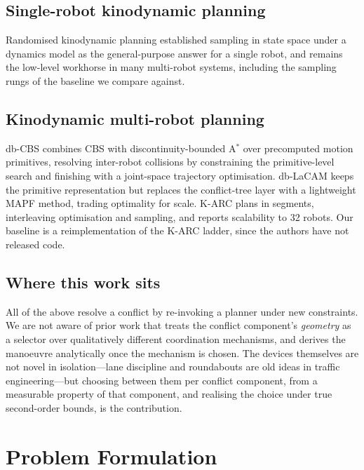 \documentclass[conference]{IEEEtran}
\begin{document}
\subsection{Single-robot kinodynamic planning}
Randomised kinodynamic planning \cite{lavalle2001} established sampling in state space
under a dynamics model as the general-purpose answer for a single robot, and remains the
low-level workhorse in many multi-robot systems, including the sampling rungs of the
baseline we compare against.

\subsection{Kinodynamic multi-robot planning}
db-CBS \cite{dbcbs2024} combines CBS with discontinuity-bounded A$^*$ over precomputed
motion primitives, resolving inter-robot collisions by constraining the primitive-level
search and finishing with a joint-space trajectory optimisation. db-LaCAM
\cite{dblacam2025} keeps the primitive representation but replaces the conflict-tree layer
with a lightweight MAPF method, trading optimality for scale. K-ARC \cite{karc2025} plans
in segments, interleaving optimisation and sampling, and reports scalability to 32 robots.
Our baseline is a reimplementation of the K-ARC ladder, since the authors have not released
code.

\subsection{Where this work sits}
All of the above resolve a conflict by re-invoking a planner under new constraints. We are
not aware of prior work that treats the conflict component's \emph{geometry} as a selector
over qualitatively different coordination mechanisms, and derives the manoeuvre
analytically once the mechanism is chosen. The devices themselves are not novel in
isolation---lane discipline and roundabouts are old ideas in traffic engineering---but
choosing between them per conflict component, from a measurable property of that
component, and realising the choice under true second-order bounds, is the contribution.

\section{Problem Formulation}
\end{document}
